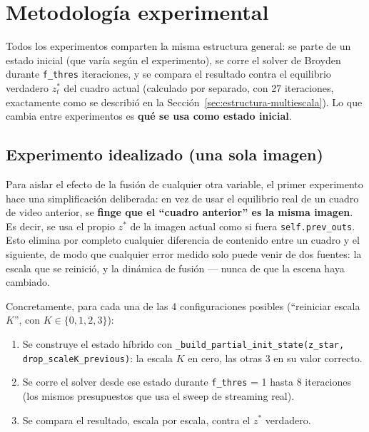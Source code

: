 \documentclass[11pt,a4paper]{article}
\newcommand{\code}[1]{\texttt{#1}}
\begin{document}
\section{Metodología experimental}

Todos los experimentos comparten la misma estructura general: se parte de un estado inicial (que
varía según el experimento), se corre el solver de Broyden durante \code{f\_thres} iteraciones, y
se compara el resultado contra el equilibrio verdadero $z^*_t$ del cuadro actual (calculado por
separado, con 27 iteraciones, exactamente como se describió en la Sección~\ref{sec:estructura-multiescala}).
Lo que cambia entre experimentos es \textbf{qué se usa como estado inicial}.

\subsection{Experimento idealizado (una sola imagen)}
\label{sec:exp-idealizado}

Para aislar el efecto de la fusión de cualquier otra variable, el primer experimento hace una
simplificación deliberada: en vez de usar el equilibrio real de un cuadro de video anterior, se
\textbf{finge que el ``cuadro anterior'' es la misma imagen}. Es decir, se usa el propio $z^*$ de la
imagen actual como si fuera \code{self.prev\_outs}. Esto elimina por completo cualquier diferencia
de contenido entre un cuadro y el siguiente, de modo que cualquier error medido solo puede venir de
dos fuentes: la escala que se reinició, y la dinámica de fusión --- nunca de que la escena haya
cambiado.

Concretamente, para cada una de las 4 configuraciones posibles (``reiniciar escala $K$'', con
$K \in \{0,1,2,3\}$):
\begin{enumerate}
  \item Se construye el estado híbrido con \code{\_build\_partial\_init\_state(z\_star,
    drop\_scaleK\_previous)}: la escala $K$ en cero, las otras 3 en su valor correcto.
  \item Se corre el solver desde ese estado durante \code{f\_thres} = 1 hasta 8 iteraciones (los
    mismos presupuestos que usa el sweep de streaming real).
  \item Se compara el resultado, escala por escala, contra el $z^*$ verdadero.
\end{enumerate}
\end{document}

